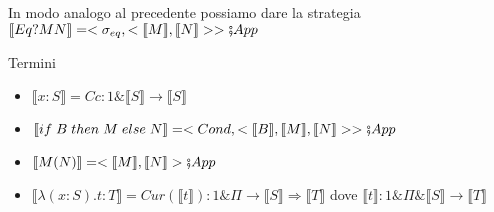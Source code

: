\documentclass{beamer}
\begin{document}
\begin{frame}
\begin{tikzpicture}
			 
			  
			\end{tikzpicture}
			
	
	In modo analogo al precedente possiamo dare la strategia $\llbracket Eq? M N \rrbracket=<\sigma_{eq}, < \llbracket M \rrbracket , \llbracket N \rrbracket > > \fatsemi App$
	
	
\end{frame}









\begin{frame}
	
	\begin{block}{Termini}
		\begin{itemize}
			\item $\llbracket x:S \rrbracket = Cc:1\& \llbracket S \rrbracket \rightarrow \llbracket S \rrbracket$
			\item $\llbracket if \; B \; then \; M \; else \; N \rrbracket = <Cond, < \llbracket B \rrbracket , \llbracket M \rrbracket , \llbracket N \rrbracket > > \fatsemi App$
			\item $\llbracket M(N) \rrbracket = < \llbracket M \rrbracket , \llbracket N \rrbracket > \fatsemi App$
			\item $\llbracket \lambda (x : S) . t : T \rrbracket = Cur(\llbracket t \rrbracket) : 1\& \Pi \rightarrow \llbracket S \rrbracket \Rightarrow \llbracket T \rrbracket$ dove $\llbracket t \rrbracket : 1\& \Pi \& \llbracket S \rrbracket \rightarrow \llbracket T \rrbracket$
		\end{itemize}
		
	\end{block}

	
\end{frame}
\end{document}
